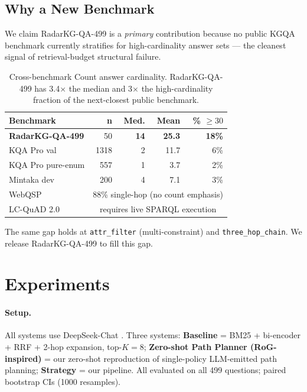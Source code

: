 \documentclass[10pt,a4paper,twocolumn]{article}
\newcommand{\qtype}[1]{\texttt{\small #1}}
\begin{document}
\subsection{Why a New Benchmark}
\label{sec:bench-design}
We claim RadarKG-QA-499 is a \emph{primary} contribution because no public KGQA benchmark currently stratifies for high-cardinality answer sets --- the cleanest signal of retrieval-budget structural failure.

\begin{table}[h]
\centering
\small
\caption{Cross-benchmark Count answer cardinality. RadarKG-QA-499 has 3.4$\times$ the median and 3$\times$ the high-cardinality fraction of the next-closest public benchmark.}
\label{tab:bench-distribution}
\begin{tabular}{l r r r r}
\toprule
\textbf{Benchmark} & \textbf{n} & \textbf{Med.} & \textbf{Mean} & \textbf{\% $\!\geq\! 30$} \\
\midrule
\textbf{RadarKG-QA-499} & 50 & \textbf{14} & \textbf{25.3} & \textbf{18\%} \\
KQA Pro val            & 1318 & 2 & 11.7 & 6\% \\
KQA Pro pure-enum      & 557 & 1 & 3.7  & 2\% \\
Mintaka dev            & 200 & 4 & 7.1  & 3\% \\
WebQSP                 & \multicolumn{4}{c}{88\% single-hop (no count emphasis)} \\
LC-QuAD 2.0            & \multicolumn{4}{c}{requires live SPARQL execution} \\
\bottomrule
\end{tabular}
\end{table}

The same gap holds at \qtype{attr\_filter} (multi-constraint) and \qtype{three\_hop\_chain}. We release RadarKG-QA-499 to fill this gap.

\section{Experiments}
\label{sec:experiments}

\paragraph{Setup.} All systems use DeepSeek-Chat \citep{deepseekv3_2024}. Three systems: \textbf{Baseline} = BM25 \citep{robertson2009bm25} + bi-encoder \citep{xiao2024bge} + RRF \citep{cormack2009rrf} + 2-hop expansion, top-$K\!=\!8$; \textbf{Zero-shot Path Planner (RoG-inspired)} = our zero-shot reproduction of single-policy LLM-emitted path planning; \textbf{Strategy} = our pipeline. All evaluated on all 499 questions; paired bootstrap CIs (1000 resamples).
\end{document}
